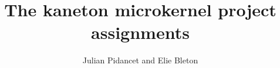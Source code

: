 
%
%

\def\path{../../../..}

%
%



%
%

\rhead{}

%
%

\title{The kaneton microkernel project assignments
       \logos}

%
%

\author{\small{Julian Pidancet} and
        \small{Elie Bleton}}

%
%



%
%

\maketitle

%
%

\tableofcontents

%
%




